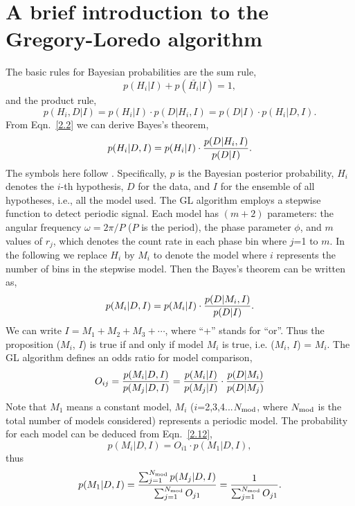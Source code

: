 \documentclass[fleqn,usenatbib]{mnras}
\begin{document}
\section{A brief introduction to the Gregory-Loredo algorithm}\label{GL}
The basic rules for Bayesian probabilities are the sum rule,
\begin{equation}
p(H_i|I)+p(\bar{H_i}|I)	=1,
\end{equation}
and the product rule,
\begin{equation}\label{2.2}
p(H_i,D|I)=p(H_i|I)\cdot p(D|H_i,I)=p(D|I)\cdot p(H_i|D,I).
\end{equation}
From Eqn.~\ref{2.2} we can derive Bayes's theorem,
\begin{equation}\label{2.5} 
p(H_i|D,I)=p(H_i|I)\cdot {p(D|H_i,I)\over p(D|I)}.
\end{equation}
The symbols here follow \cite{1992ApJ...398..146G}.
Specifically, $p$ is the Bayesian posterior probability, $H_i$ denotes the $i$-th hypothesis, $D$ for the data, and $I$ for the ensemble of all hypotheses, i.e., all the model used.
The GL algorithm employs a stepwise function to detect periodic signal. Each model has $(m+2)$ parameters: the angular frequency $\omega={2\pi/P}$ ($P$ is the period), the phase parameter $\phi$, and $m$ values of $r_j$, which denotes the count rate in each phase bin where $j$=1 to $m$. In the following we replace $H_i$ by $M_i$ to denote the model where $i$ represents the number of bins in the stepwise model. Then the Bayes's theorem can be written as,
 \begin{equation}\label{2.11}
 p(M_i|D,I)=p(M_i|I)\cdot {p(D|M_i,I)\over p(D|I)}.
 \end{equation} 
We can write $I=M_1+M_2+M_3+\cdots$, where ``+'' stands for ``or''. Thus the proposition ($M_i$, $I$) is true if and only if model $M_i$ is true, i.e. ($M_i$, $I$) = $M_i$. The GL algorithm defines an odds ratio for model comparison,
\begin{equation}\label{2.12}
O_{ij}={p(M_i|D,I)\over p(M_j|D,I)}={p(M_i|I)\over p(M_j|I)}\cdot {p(D|M_i)\over p(D|M_j)}
\end{equation}
Note that $M_1$ means a constant model, $M_i$ ($i$=2,3,4...$N_{\rm mod}$, where $N_{\rm mod}$ is the total number of models considered) represents a periodic model. The probability for each model can be deduced from Eqn.~\ref{2.12},
\begin{equation}\label{6}
p(M_i|D,I)=O_{i1}\cdot p(M_1|D,I),
\end{equation}
thus
\begin{equation}\label{7}
p(M_1|D,I)={{\sum_{j=1}^{N_{\rm mod}} p(M_j|D,I)}\over {\sum_{j=1}^{N_{\rm mod}} O_{j1}}}
={1\over {\sum_{j=1}^{N_{\rm mod}} O_{j1}}}.
\end{equation}
\end{document}
